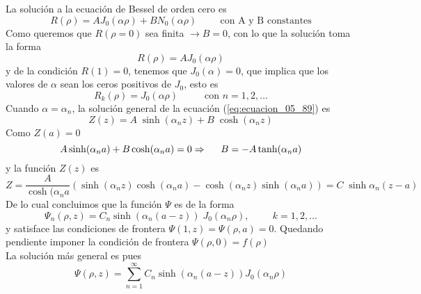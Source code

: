 La solución a la ecuación de Bessel de orden cero es
\begin{equation}
R(\rho) =  A J_{0} (\alpha \rho) + B N_{0} (\alpha \rho) \hspace{1cm} \mbox{con A y B constantes}
\label{eq:ecuacion_05_91}
\end{equation}
Como queremos que $R(\rho=0)$ sea finita $\rightarrow B = 0$, con lo que la solución toma la forma
\begin{equation}
R(\rho) = A J_{0}(\alpha \rho)
\label{eq:ecuacion_05_92}
\end{equation}
y de la condición $R(1) =0$, tenemos que $J_{0}(\alpha)=0$, que implica que los valores de $\alpha$ sean los ceros positivos de $J_{0}$, esto es
\begin{equation}
R_{k}(\rho) = J_{0} (\alpha \rho) \hspace{1cm} \mbox{ con $n=1,2,\ldots$}
\label{eq:ecuacion_05_93}
\end{equation}
Cuando $\alpha = \alpha_{n}$, la solución general de la ecuación (\ref{eq:ecuacion_05_89}) es
\begin{equation}
Z(z) = A \; \sinh( \alpha_{n} z) +  B \; \cosh(\alpha_{n} z) 
\label{eq:ecuacion_05_94}
\end{equation}
Como $Z(a) = 0$
\begin{equation}
A \sinh (\alpha_{n} a) + B \cosh (\alpha_{n} a) = 0 \Rightarrow \hspace{0.5cm} B = - A \tanh (\alpha_{n} a)
\label{eq:ecuacion_05_95}	
\end{equation}
y la función $Z(z)$ es
\begin{equation}
Z = \dfrac{A}{\cosh	(\alpha_{n} a} ( \sinh(\alpha_{n} z) \cosh (\alpha_{n} a)  - \cosh (\alpha_{n} z) \sinh(\alpha_{n} a)) =  C \; \sinh \alpha_{n} (z - a)
\label{eq:ecuacion_05_96}
\end{equation}
De lo cual concluimos que la función $\Psi$ es de la forma
\begin{equation}
\Psi_{n} (\rho, z) = C_{n} \sinh(\alpha_{n} (a -z)) \; J_{0}(\alpha_{n} \rho), \hspace{1cm} k = 1, 2, \ldots
\label{eq:ecuacion_05_97}
\end{equation}
y satisface las condiciones de frontera $\Psi(1,z) = \Psi(\rho, a) = 0$. Quedando pendiente imponer la condición de frontera $\Psi(\rho, 0) = f(\rho)$
\\
La solución más general es pues
\begin{equation}
\Psi(\rho, z) =  \sum_{n=1}^{\infty} C_{n} \sinh(\alpha_{n} (a -z)) J_{0}(\alpha_{n} \rho)
\label{eq:ecuacion_05_98}
\end{equation}
